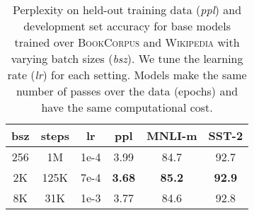 \begin{table}[t]

\begin{center}
\begin{tabular}{cccccc}
\toprule


\bf bsz & \bf steps & \bf lr & \bf ppl & \bf MNLI-m & \bf SST-2 \\
\midrule
256 & 1M & 1e-4 & 3.99 & 84.7 & 92.7 \\
2K & 125K & 7e-4 & \textbf{3.68} & \textbf{85.2} & \textbf{92.9} \\
8K & 31K & 1e-3 & 3.77 & 84.6 & 92.8 \\
\bottomrule
\end{tabular}
\end{center}
\caption{
Perplexity on held-out training data (\emph{ppl}) and development set accuracy for base models trained over \textsc{BookCorpus} and \textsc{Wikipedia} with varying batch sizes (\emph{bsz}).
We tune the learning rate (\emph{lr}) for each setting.
Models make the same number of passes over the data (epochs) and have the same computational cost.
}

\label{tab:large_batches}

\end{table}